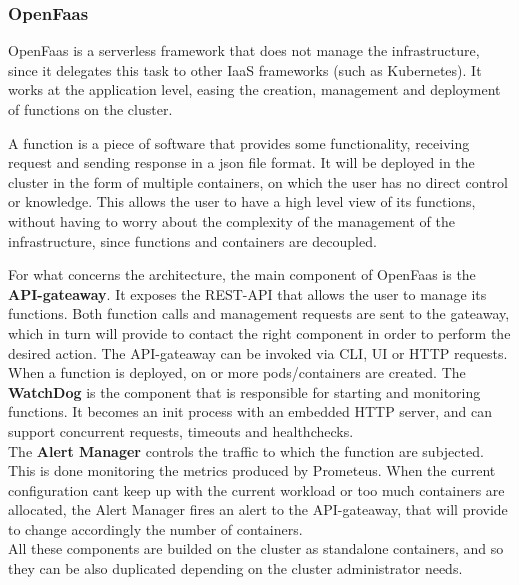 \subsubsection*{OpenFaas}
OpenFaas is a serverless framework that does not manage the infrastructure, since it delegates
this task to other IaaS frameworks (such as Kubernetes).
It works at the application level, easing the creation, management and deployment of functions
on the cluster. 
\par
A function is a piece of software that provides some functionality, receiving request and sending response
in a json file format. It will be deployed in the cluster in the form of multiple containers,
on which the user has no direct control or knowledge.
This allows the user to have a high level view of its functions, without having
to worry about the complexity of the management of the infrastructure, since functions and containers are decoupled.
\par
For what concerns the architecture, the main component of OpenFaas is the \textbf{API-gateaway}.
It exposes the REST-API that allows the user to manage its functions.
Both function calls and management requests are sent to the gateaway, which in turn will provide
to contact the right component in order to perform the desired action.
The API-gateaway can be invoked via CLI, UI or HTTP requests.
\\
When a function is deployed, on or more pods/containers are created. The \textbf{WatchDog}
is the component that is responsible for starting and monitoring functions. It becomes
an init process with an embedded HTTP server, and can support concurrent requests, timeouts and
healthchecks.
\\
The \textbf{Alert Manager} controls the traffic to which the function are subjected.
This is done monitoring the metrics produced by Prometeus. When the current configuration
cant keep up with the current workload or too much containers are allocated, the Alert Manager
fires an alert to the API-gateaway, that will provide to change accordingly the number of containers.
\\
All these components are builded on the cluster as standalone containers, and so they can be also
duplicated depending on the cluster administrator needs.

